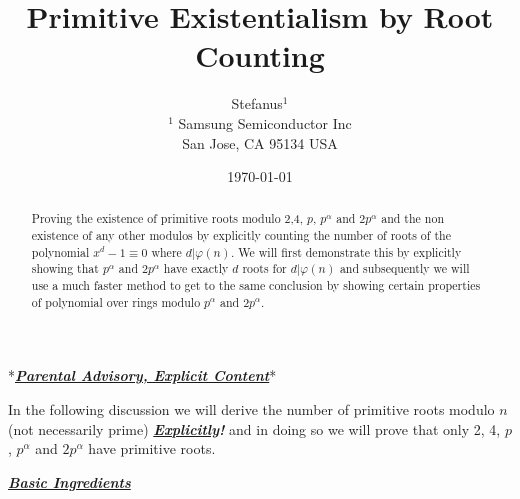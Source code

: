 \documentclass[aps,preprint,preprintnumbers,nofootinbib,showpacs,prd]{revtex4-1}
\begin{document}
\title{Primitive Existentialism by Root Counting}
\bigskip
\author{Stefanus$^1$\\
$^1$ Samsung Semiconductor Inc\\ San Jose, CA 95134 USA\\
}
%
\date{\today}
%
\begin{abstract}
Proving the existence of primitive roots modulo 2,4, $p$, $p^\alpha$ and $2p^\alpha$ and the non existence of any other modulos by explicitly counting the number of roots of the polynomial $x^d - 1\equiv 0$ where $d|\varphi(n)$. We will first demonstrate this by explicitly showing that $p^\alpha$ and $2p^\alpha$ have exactly $d$ roots for $d|\varphi(n)$ and subsequently we will use a much faster method to get to the same conclusion by showing certain properties of polynomial over rings modulo $p^\alpha$ and $2p^\alpha$.

\end{abstract}
%
\maketitle

\renewcommand{\theequation}{A.\arabic{equation}}  %
\setcounter{equation}{0}  %

*\hspace{0.5mm}\underline{\textit{\textbf {Parental Advisory, Explicit Content}}}\hspace{0.7mm}*

In the following discussion we will derive the number of primitive roots modulo $n$ (not necessarily prime) \underline{\textbf{\textit{Explicitly}}}\textbf{\textit{!}} and in doing so we will prove that only 2, 4, $p$, $p^\alpha$ and $2p^\alpha$ have primitive roots.

\bigskip
\underline{\textit{\textbf{Basic Ingredients}}}
\bigskip
\end{document}

